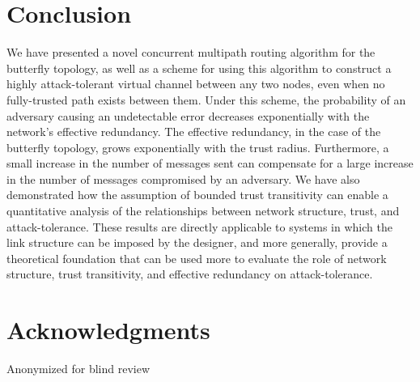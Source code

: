 \documentclass[sigconf]{acmart}
\begin{document}
\section{Conclusion}
\label{sec-conclusion}

We have presented a novel concurrent multipath routing algorithm for the butterfly
topology,
as well as a scheme for using this algorithm to construct a highly attack-tolerant
virtual channel between any two nodes, even when no fully-trusted path exists
between them.
Under this scheme, the probability of an adversary causing an undetectable error
decreases exponentially with the network's effective redundancy.
The effective redundancy, in the case of the butterfly topology,
grows exponentially with the trust radius.
Furthermore, a small increase in the number of messages sent can compensate
for a large increase in the number of messages compromised by an adversary.
We have also demonstrated how the assumption of bounded trust
transitivity can enable a quantitative analysis of the
relationships between network structure, trust, and attack-tolerance.
These results are directly applicable to systems in which the link
structure can be imposed by the designer,
and more generally, provide a theoretical foundation that can be used more to evaluate
the role of network structure, trust transitivity, and effective redundancy
on attack-tolerance.

\section{Acknowledgments}
Anonymized for blind review


 
\end{document}
